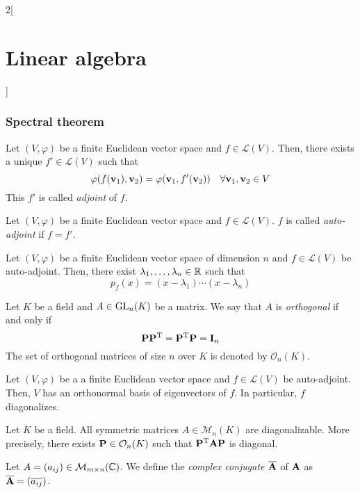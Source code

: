 \documentclass[../../../main.tex]{subfiles}
\begin{document}
\begin{multicols}{2}[\section{Linear algebra}]
  \subsubsection{Spectral theorem}
  \begin{definition}
    Let $(V,\varphi)$ be a finite Euclidean vector space and $f\in\mathcal{L}(V)$. Then, there exists a unique $f'\in\mathcal{L}(V)$ such that $$\varphi(f(\boldsymbol{\mathrm{v}}_1),\boldsymbol{\mathrm{v}}_2)=\varphi(\boldsymbol{\mathrm{v}}_1,f'(\boldsymbol{\mathrm{v}}_2))\quad\forall \boldsymbol{\mathrm{v}}_1,\boldsymbol{\mathrm{v}}_2\in V$$ This $f'$ is called \emph{adjoint} of $f$.
  \end{definition}
  \begin{definition}
    Let $(V,\varphi)$ be a finite Euclidean vector space and $f\in\mathcal{L}(V)$. $f$ is called \emph{auto-adjoint} if $f=f'$.
  \end{definition}
  \begin{lemma}
    Let $(V,\varphi)$ be a finite Euclidean vector space of dimension $n$ and $f\in\mathcal{L}(V)$ be auto-adjoint. Then, there exist $\lambda_1,\ldots,\lambda_n\in\mathbb{R}$ such that $$p_f(x)=(x-\lambda_1 )\cdots(x-\lambda_n)$$
  \end{lemma}
  \begin{definition}
    Let $K$ be a field and $A\in\mathrm{GL}_n(K)$ be a matrix. We say that $A$ is \emph{orthogonal} if and only if $$\boldsymbol{\mathrm{P}}\vb{P}^{\mathrm{T}}=\vb{P}^{\mathrm{T}}\boldsymbol{\mathrm{P}}=\boldsymbol{\mathrm{I}}_n$$ The set of orthogonal matrices of size $n$ over $K$ is denoted by $\mathcal{O}_n(K)$.
  \end{definition}
  \begin{theorem}
    Let $(V,\varphi)$ be a a finite Euclidean vector space and $f\in\mathcal{L}(V)$ be auto-adjoint. Then, $V$ has an orthonormal basis of eigenvectors of $f$. In particular, $f$ diagonalizes.
  \end{theorem}
  \begin{corollary}
    Let $K$ be a field. All symmetric matrices $A\in\mathcal{M}_n(K)$ are diagonalizable. More precisely, there exists $\boldsymbol{\mathrm{P}}\in\mathcal{O}_n(K)$ such that $\vb{P}^{\mathrm{T}}\boldsymbol{\mathrm{A}}\boldsymbol{\mathrm{P}}$ is diagonal.
  \end{corollary}
  \begin{definition}
    Let $A=(a_{ij})\in\mathcal{M}_{m\times n}(\mathbb{C})$. We define the \emph{complex conjugate} $\overline{\boldsymbol{\mathrm{A}}}$ of $\boldsymbol{\mathrm{A}}$ as $\overline{\boldsymbol{\mathrm{A}}}=(\overline{a_{ij}})$.
  \end{definition}

\end{multicols}
\end{document}
